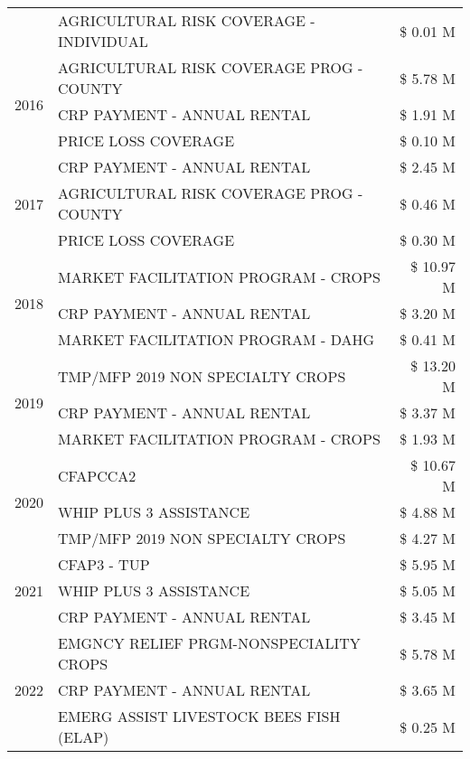 \begin{tabular}{llr}
 & AGRICULTURAL RISK COVERAGE - INDIVIDUAL & \$ 0.01 M \\
\cline{1-3}
\multirow[t]{3}{*}{2016} & AGRICULTURAL RISK COVERAGE PROG - COUNTY & \$ 5.78 M \\
 & CRP PAYMENT - ANNUAL RENTAL & \$ 1.91 M \\
 & PRICE LOSS COVERAGE & \$ 0.10 M \\
\cline{1-3}
\multirow[t]{3}{*}{2017} & CRP PAYMENT - ANNUAL RENTAL & \$ 2.45 M \\
 & AGRICULTURAL RISK COVERAGE PROG - COUNTY & \$ 0.46 M \\
 & PRICE LOSS COVERAGE & \$ 0.30 M \\
\cline{1-3}
\multirow[t]{3}{*}{2018} & MARKET FACILITATION PROGRAM - CROPS & \$ 10.97 M \\
 & CRP PAYMENT - ANNUAL RENTAL & \$ 3.20 M \\
 & MARKET FACILITATION PROGRAM - DAHG & \$ 0.41 M \\
\cline{1-3}
\multirow[t]{3}{*}{2019} & TMP/MFP 2019 NON SPECIALTY CROPS & \$ 13.20 M \\
 & CRP PAYMENT - ANNUAL RENTAL & \$ 3.37 M \\
 & MARKET FACILITATION PROGRAM - CROPS & \$ 1.93 M \\
\cline{1-3}
\multirow[t]{3}{*}{2020} & CFAPCCA2 & \$ 10.67 M \\
 & WHIP PLUS 3 ASSISTANCE & \$ 4.88 M \\
 & TMP/MFP 2019 NON SPECIALTY CROPS & \$ 4.27 M \\
\cline{1-3}
\multirow[t]{3}{*}{2021} & CFAP3 - TUP & \$ 5.95 M \\
 & WHIP PLUS 3 ASSISTANCE & \$ 5.05 M \\
 & CRP PAYMENT - ANNUAL RENTAL & \$ 3.45 M \\
\cline{1-3}
\multirow[t]{3}{*}{2022} & EMGNCY RELIEF PRGM-NONSPECIALITY CROPS & \$ 5.78 M \\
 & CRP PAYMENT - ANNUAL RENTAL & \$ 3.65 M \\
 & EMERG ASSIST LIVESTOCK BEES FISH (ELAP) & \$ 0.25 M \\
\cline{1-3}
\bottomrule
\end{tabular}
